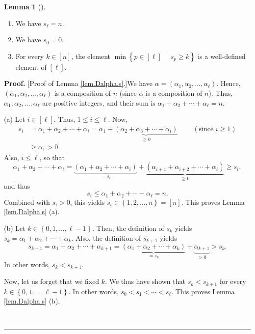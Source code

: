 \documentclass[numbers=enddot,12pt,final,onecolumn,notitlepage,abstracton]{scrartcl}
\theoremstyle{definition}
\newtheorem{lem}[theo]{Lemma}
\newenvironment{lemma}[1][]
{\begin{lem}[#1]\begin{leftbar}}
{\end{leftbar}\end{lem}}
\newenvironment{proof}[1][Proof]{\noindent\textbf{#1.} }{\ \rule{0.5em}{0.5em}}
\newenvironment{verlong}{}{}
\begin{document}
\begin{verlong}
\begin{footnotesize}
\begin{lemma}
\begin{enumerate}
\item[(e)] We have $s_{\ell}=n$.

\item[(f)] We have $s_{0}=0$.

\item[(g)] For every $k\in\left[  n\right]  $, the element $\min\left\{
p\in\left[  \ell\right]  \ \mid\ s_{p}\geq k\right\}  $ is a well-defined
element of $\left[  \ell\right]  $.
\end{enumerate}
\end{lemma}

\begin{proof}
[Proof of Lemma \ref{lem.Dalpha.s}.]We have $\alpha=\left(  \alpha_{1}%
,\alpha_{2},\ldots,\alpha_{\ell}\right)  $. Hence, $\left(  \alpha_{1}%
,\alpha_{2},\ldots,\alpha_{\ell}\right)  $ is a composition of $n$ (since
$\alpha$ is a composition of $n$). Thus, $\alpha_{1},\alpha_{2},\ldots
,\alpha_{\ell}$ are positive integers, and their sum is $\alpha_{1}+\alpha
_{2}+\cdots+\alpha_{\ell}=n$.

(a) Let $i\in\left[  \ell\right]  $. Thus, $1\leq i\leq\ell$. Now,%
\begin{align*}
s_{i}  &  =\alpha_{1}+\alpha_{2}+\cdots+\alpha_{i}=\alpha_{1}%
+\underbrace{\left(  \alpha_{2}+\alpha_{3}+\cdots+\alpha_{i}\right)  }_{\geq
0}\ \ \ \ \ \ \ \ \ \ \left(  \text{since }i\geq1\right) \\
&  \geq\alpha_{1}>0.
\end{align*}
Also, $i\leq\ell$, so that%
\[
\alpha_{1}+\alpha_{2}+\cdots+\alpha_{\ell}=\underbrace{\left(  \alpha
_{1}+\alpha_{2}+\cdots+\alpha_{i}\right)  }_{=s_{i}}+\underbrace{\left(
\alpha_{i+1}+\alpha_{i+2}+\cdots+\alpha_{\ell}\right)  }_{\geq0}\geq s_{i},
\]
and thus
\[
s_{i}\leq\alpha_{1}+\alpha_{2}+\cdots+\alpha_{\ell}=n.
\]
Combined with $s_{i}>0$, this yields $s_{i}\in\left\{  1,2,\ldots,n\right\}
=\left[  n\right]  $. This proves Lemma \ref{lem.Dalpha.s} (a).

(b) Let $k\in\left\{  0,1,\ldots,\ell-1\right\}  $. Then, the definition of
$s_{k}$ yields $s_{k}=\alpha_{1}+\alpha_{2}+\cdots+\alpha_{k}$. Also, the
definition of $s_{k+1}$ yields%
\[
s_{k+1}=\alpha_{1}+\alpha_{2}+\cdots+\alpha_{k+1}=\underbrace{\left(
\alpha_{1}+\alpha_{2}+\cdots+\alpha_{k}\right)  }_{=s_{k}}+\underbrace{\alpha
_{k+1}}_{>0}>s_{k}.
\]
In other words, $s_{k}<s_{k+1}$.

Now, let us forget that we fixed $k$. We thus have shown that $s_{k}<s_{k+1}$
for every $k\in\left\{  0,1,\ldots,\ell-1\right\}  $. In other words,
$s_{0}<s_{1}<\cdots<s_{\ell}$. This proves Lemma \ref{lem.Dalpha.s} (b).


\end{proof}
\end{footnotesize}
\end{verlong}
\end{document}

